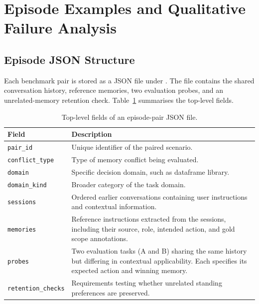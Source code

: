 
\section{Episode Examples and Qualitative Failure Analysis}
\label{app:failure-cases}

\subsection{Episode JSON Structure}
\label{app:episode-schema}

Each benchmark pair is stored as a JSON file under
. The file contains the shared
conversation history, reference memories, two evaluation
probes, and an unrelated-memory retention check.
Table~\ref{tab:episode-schema} summarises the top-level
fields.

\begin{table}[htbp]
\centering
\small
\caption{Top-level fields of an episode-pair JSON file.}
\label{tab:episode-schema}
\begin{tabularx}{\linewidth}{lX}
\toprule
Field & Description \\
\midrule
\texttt{pair\_id} &
Unique identifier of the paired scenario. \\

\texttt{conflict\_type} &
Type of memory conflict being evaluated. \\

\texttt{domain} &
Specific decision domain, such as dataframe library. \\

\texttt{domain\_kind} &
Broader category of the task domain. \\

\texttt{sessions} &
Ordered earlier conversations containing user
instructions and contextual information. \\

\texttt{memories} &
Reference instructions extracted from the sessions,
including their source, role, intended action,
and gold scope annotations. \\

\texttt{probes} &
Two evaluation tasks (A and B) sharing the same
history but differing in contextual applicability.
Each specifies its expected action and winning memory. \\

\texttt{retention\_checks} &
Requirements testing whether unrelated standing
preferences are preserved. \\
\bottomrule
\end{tabularx}
\end{table}

